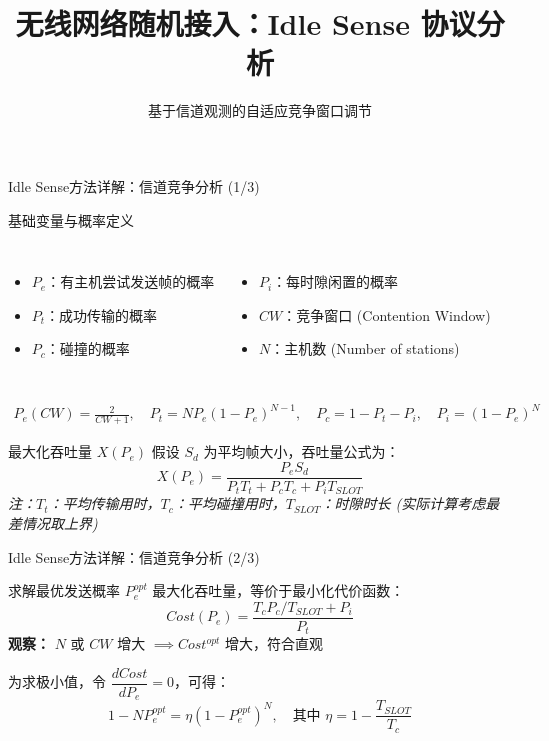 \documentclass[10pt, aspectratio=169]{beamer}
\title{无线网络随机接入：Idle Sense 协议分析}
\subtitle{基于信道观测的自适应竞争窗口调节}
\date{}
\begin{document}
\begin{frame}{Idle Sense方法详解：信道竞争分析 (1/3)}
\begin{block}{基础变量与概率定义}
    \begin{columns}[T]
        \begin{itemize}
            \item \(P_e\)：有主机尝试发送帧的概率
            \item \(P_t\)：成功传输的概率
            \item \(P_c\)：碰撞的概率
        \end{itemize}
        \begin{itemize}
            \item \(P_i\)：每时隙闲置的概率
            \item \(CW\)：竞争窗口 (Contention Window)
            \item \(N\)：主机数 (Number of stations)
        \end{itemize}
    \end{columns}
    \begin{align*}
        P_e(CW) = \frac{2}{CW + 1},\quad P_t = N P_e (1 - P_e)^{N-1} ,\quad P_c = 1 - P_t - P_i ,\quad P_i = (1 - P_e)^N
    \end{align*}
\end{block}

\begin{block}{最大化吞吐量 \(X(P_e)\)}
    假设 \(S_d\) 为平均帧大小，吞吐量公式为：
    \[
    X(P_e) = \frac{P_e S_d}{P_t T_t + P_c T_c + P_i T_{SLOT}}
    \]
    \footnotesize{\textit{注：\(T_t\)：平均传输用时，\(T_c\)：平均碰撞用时，\(T_{SLOT}\)：时隙时长 (实际计算考虑最差情况取上界)}}
\end{block}
\end{frame}

\begin{frame}{Idle Sense方法详解：信道竞争分析 (2/3)}
\begin{block}{求解最优发送概率 \(P_e^{opt}\)}
    最大化吞吐量，等价于最小化代价函数：
    \[
    Cost(P_e) = \frac{T_c P_c / T_{SLOT} + P_i}{P_t}
    \]
    \textbf{观察：} \(N\) 或 \(CW\) 增大 \(\implies Cost^{opt}\) 增大，符合直观

    为求极小值，令 \(\dfrac{dCost}{dP_e} = 0\)，可得：
    \[
    1 - N P_e^{opt} = \eta (1 - P_e^{opt})^N, \quad \text{其中 } \eta = 1 - \frac{T_{SLOT}}{T_c}
    \]
\end{block}
\end{frame}
\end{document}
